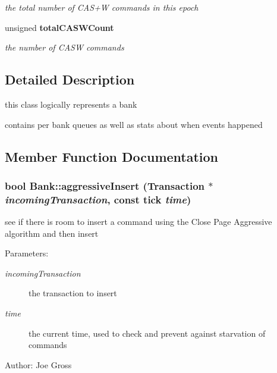 \begin{CompactItemize}
\begin{CompactList}\small\item\em the total number of CAS+W commands in this epoch \item\end{CompactList}\item 
unsigned {\bf totalCASWCount}\label{class_d_r_a_msim_i_i_1_1_bank_97b466c58dcf79bf7aec3172e0c8d70e}

\begin{CompactList}\small\item\em the number of CASW commands \item\end{CompactList}\end{CompactItemize}


\subsection{Detailed Description}
this class logically represents a bank 

contains per bank queues as well as stats about when events happened 

\subsection{Member Function Documentation}
\subsubsection[{aggressiveInsert}]{\setlength{\rightskip}{0pt plus 5cm}bool Bank::aggressiveInsert ({\bf Transaction} $\ast$ {\em incomingTransaction}, \/  const tick {\em time})}\label{class_d_r_a_msim_i_i_1_1_bank_c482cea1bc37902a208c9f848df27355}


see if there is room to insert a command using the Close Page Aggressive algorithm and then insert 

\begin{Desc}
\item[Parameters:]
\begin{description}
\item[{\em incomingTransaction}]the transaction to insert \item[{\em time}]the current time, used to check and prevent against starvation of commands \end{description}
\end{Desc}
\begin{Desc}
\item[Author:]Joe Gross \end{Desc}
